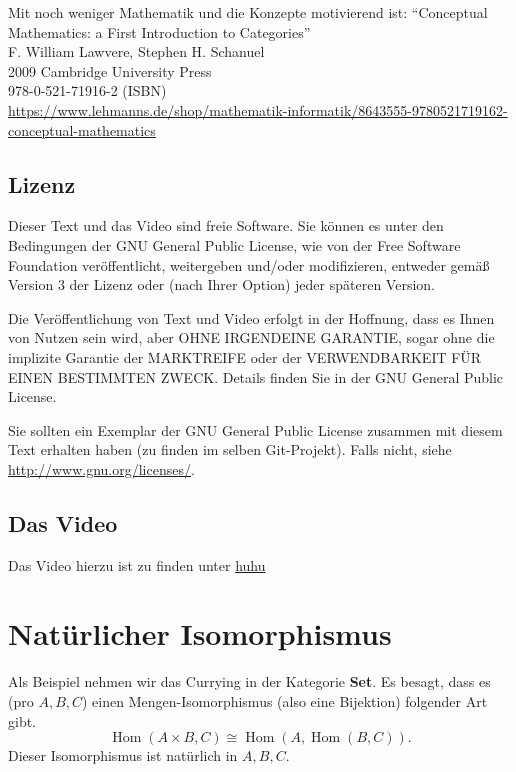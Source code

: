 \documentclass[a4paper]{amsart}
\theoremstyle{definition}
\DeclareMathOperator{\Hom}{Hom}
\begin{document}
Mit noch weniger Mathematik und die Konzepte motivierend ist:
"`Conceptual Mathematics: a First Introduction to Categories"'\\
F. William Lawvere, Stephen H. Schanuel\\
2009 Cambridge University Press\\
978-0-521-71916-2 (ISBN)\\
{\tiny\url{https://www.lehmanns.de/shop/mathematik-informatik/8643555-9780521719162-conceptual-mathematics}}

\subsection*{Lizenz}
Dieser Text und das Video sind freie Software. Sie können es unter den Bedingungen der 
GNU General Public License, wie von der Free Software Foundation veröffentlicht, weitergeben 
und/oder modifizieren, entweder gemäß Version 3 der Lizenz oder (nach Ihrer Option) jeder späteren Version.

Die Veröffentlichung von Text und Video erfolgt in der Hoffnung, dass es Ihnen von Nutzen sein wird, 
aber OHNE IRGENDEINE GARANTIE, sogar ohne die implizite Garantie der MARKTREIFE oder der 
VERWENDBARKEIT FÜR EINEN BESTIMMTEN ZWECK. Details finden Sie in der GNU General Public License.

Sie sollten ein Exemplar der GNU General Public License zusammen mit diesem Text erhalten haben 
(zu finden im selben Git-Projekt). 
Falls nicht, siehe \url{http://www.gnu.org/licenses/}.

\subsection*{Das Video}
Das Video hierzu ist zu finden unter 
{\tiny
   \url{huhu}
}

\section{Natürlicher Isomorphismus}
Als Beispiel nehmen wir das Currying in der Kategorie \textbf{Set}. Es besagt, dass es (pro $A, B, C$) einen Mengen-Isomorphismus (also eine Bijektion) folgender Art gibt.
\begin{equation}
   \Hom( A \times B, C ) \cong \Hom( A, \Hom( B, C)).
\end{equation}
Dieser Isomorphismus ist natürlich in $A, B, C$.
\end{document}
